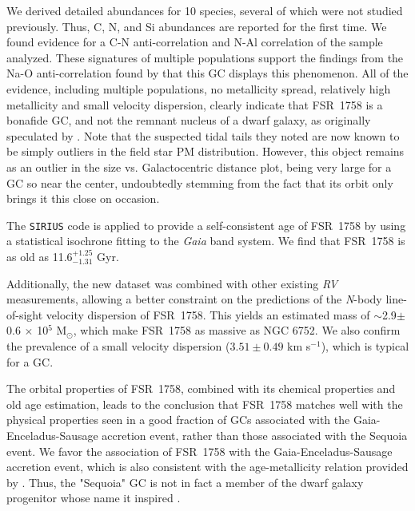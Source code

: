 \documentclass[longauth]{aa} %
\begin{document}
We derived detailed abundances for 10 species, several of which were not studied previously. Thus, C, N, and Si abundances are reported for the first time. We found evidence for a C-N anti-correlation and N-Al correlation of the sample analyzed. These signatures of multiple populations support the findings from the  Na-O anti-correlation found by \citet{Villanova2019} that this GC displays this phenomenon. All of the evidence,  including multiple populations, no metallicity spread, relatively high metallicity and small velocity dispersion, clearly indicate that FSR~1758 is a bonafide GC, and not the remnant nucleus of a dwarf galaxy, as originally speculated by \citet{Barba2019}. Note that the suspected tidal tails they noted are now known to be simply outliers in the field star PM distribution. However, this object remains as an outlier in the size vs. Galactocentric distance plot, being very large for a GC so near the center, undoubtedly stemming from the fact that its orbit only brings it this close on occasion.

The \texttt{SIRIUS} code is applied to provide a self-consistent  age of FSR~1758 by using a statistical isochrone fitting to the \textit{Gaia} band system. We find that FSR~1758 is as old as 11.6$^{+1.25}_{-1.31}$ Gyr. 

Additionally, the new dataset was combined with other existing \textit{RV} measurements, allowing a better constraint on the predictions of the \textit{N}-body line-of-sight velocity dispersion of FSR~1758. This yields an estimated mass of $\sim$2.9$\pm$0.6 $\times$ 10$^{5}$ M$_{\odot}$, which make FSR~1758 as massive as NGC 6752. We also confirm the prevalence of a small velocity dispersion ($3.51\pm0.49$ km s$^{-1}$), which is typical for a GC. 

The orbital properties of FSR~1758, combined with its chemical properties and old age estimation, leads to the conclusion that FSR~1758 matches well with the physical properties seen in a good fraction of GCs associated with the Gaia-Enceladus-Sausage accretion event, rather than those associated with the Sequoia event. We  favor the association of FSR~1758 with the Gaia-Enceladus-Sausage accretion event, which is also consistent with the age-metallicity relation provided by \citet{Massari2019}. Thus, the "Sequoia" GC is not in fact a member of the dwarf galaxy progenitor  whose name it inspired \citep{Myeong2019, Koppelman2019}.
	
\end{document}
